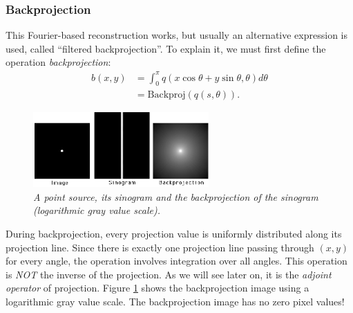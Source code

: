 \documentclass[11pt,oneside]{book}
\begin{document}
\subsubsection{Backprojection} \label{sec:backprojection}
This Fourier-based reconstruction works, but usually an alternative expression
is used, called ``filtered backprojection''. To explain it, we must first define
the operation {\em backprojection}:
\begin{align}
 b(x,y) &= \int_0^\pi q(x \cos \theta + y \sin \theta, \theta) d \theta
             \nonumber\\
      &= \mbox{Backproj} \left( q(s, \theta) \right). \label{eq:jnbackproj}
\end{align}

\begin{figure}[tb]
\centering
\includegraphics[width=0.6\textwidth]{figs/fig_backproj.pdf}
\caption{\label{fig:backproj} \emph{A point source, its sinogram and the
backprojection of the sinogram (logarithmic gray value scale).}}
\end{figure}

During backprojection, every projection value is uniformly distributed
along its projection line. Since there is exactly one projection line
passing through $(x,y)$ for every angle, the operation involves
integration over all angles. This operation is {\em NOT} the inverse
of the projection. As we will see later on, it is the {\em adjoint
operator} of projection. Figure \ref{fig:backproj} shows the
backprojection image using a logarithmic gray value scale. The
backprojection image has no zero pixel values!
\end{document}
